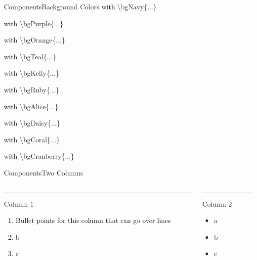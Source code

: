 \documentclass[aspectratio=169,t]{beamer}
\begin{document}
\begin{frame}{Components}{Background Colors}
   with \textbackslash bgNavy\{...\}

   with \textbackslash bgPurple\{...\}

   with \textbackslash bgOrange\{...\}

   with \textbackslash bgTeal\{...\}

   with \textbackslash bgKelly\{...\}

   with \textbackslash bgRuby\{...\}

   with \textbackslash bgAlice\{...\}

   with \textbackslash bgDaisy\{...\}

   with \textbackslash bgCoral\{...\}

   with \textbackslash bgCranberry\{...\}
\end{frame}

\begin{frame}{Components}{Two Columns}
  \begin{columns}[T]
  \begin{column}{.50\textwidth}
    \vspace{0pt}
    {\color{accent}\rule{\linewidth}{2pt}}
    Column 1

    \begin{enumerate}
      \item Bullet points for this column that can go over lines
      \item b
      \item c
    \end{enumerate}
  \end{column}
  
  \hfill
  
  \begin{column}{.50\textwidth}
    {\color{accent}\rule{\linewidth}{2pt}}
    Column 2

    \begin{itemize}
      \item a
      \item b
      \item c
    \end{itemize}
  \end{column}
  \end{columns}
\end{frame}
\end{document}
